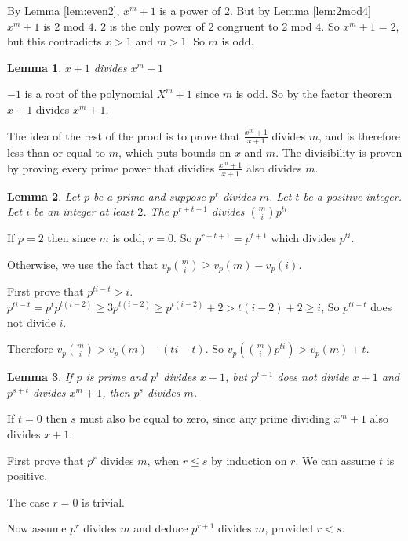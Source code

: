 \documentclass[11pt]{article} %
\newtheorem{lemma}{Lemma}
\begin{document}
By Lemma \ref{lem:even2}, $x^m + 1$ is a power of $2$. But by
Lemma \ref{lem:2mod4} $x^m + 1$ is $2$ mod $4$. $2$ is the only power of $2$ congruent to
$2$ mod $4$. So $x^m + 1 = 2$, but this contradicts $x > 1$ and $m > 1$. So $m$ is odd.

\begin{lemma}\label{lem:poly}
$x + 1$ divides $x^m + 1$
\end{lemma}
$-1$ is a root of the polynomial $X^m + 1$ since $m$ is odd. So by the factor theorem $x+1$ divides
$x^m + 1$.

The idea of the rest of the proof is to prove that $\frac{x^m+1}{x+1}$ divides $m$, and is therefore less
than or equal to $m$, which puts bounds on $x$ and $m$. The divisibility is proven by proving every prime power that
dividies $\frac{x^m+1}{x+1}$ also divides $m$.

\begin{lemma}\label{lem:dvdchoose}
  Let $p$ be a prime and suppose $p^r$ divides $m$. Let $t$ be a positive integer.
  Let $i$ be an integer at least $2$. The $p^{r + t + 1}$ divides ${{m}\choose{i}} p^{ti}$
\end{lemma}

If $p=2$ then since $m$ is odd, $r = 0$. So $p^{r + t +1} = p^{t+1}$ which divides $p^{ti}$.

Otherwise, we use the fact that $v_p{{m}\choose {i}} \ge v_p(m) - v_p(i)$.

First prove that $p^{ti - t} > i$.
$p^{ti - t} = p ^{t} p^{t(i-2)} \ge 3p^{t(i-2)} \ge p^{t(i-2)} + 2 > t(i-2) + 2 \ge i$,
So $p^{ti - t}$ does not divide $i$.

Therefore $v_p{{m}\choose {i}} > v_p(m) - (ti - t) $.
So $v_p\left({{m}\choose {i}}p^{ti}\right) > v_p(m) + t$.

\begin{lemma}\label{lem:primepowdvd}
  If $p$ is prime and $p^t$ divides $x+1$, but $p^{t+1}$ does not divide $x+1$ and
  $p^{s+t}$ divides $x^m + 1$, then $p^{s}$ divides $m$.
\end{lemma}

If $t=0$ then $s$ must also be equal to zero, since any prime dividing $x^m+1$ also divides $x+1$.

First prove that $p^r$ divides $m$, when $r \le s$ by induction on $r$.
We can assume $t$ is positive.

The case $r = 0$ is trivial.

Now assume $p^r$ divides $m$ and deduce $p^{r+1}$ divides $m$, provided $r < s$.
\end{document}
